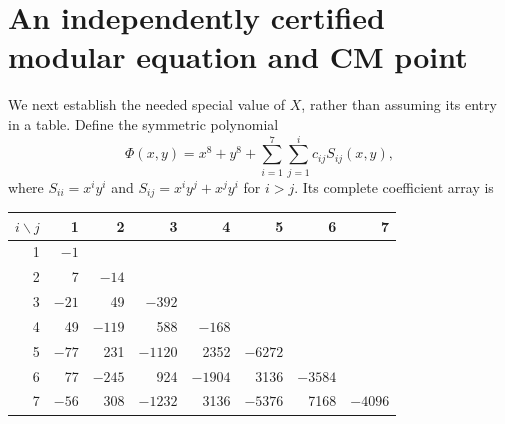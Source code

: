 \documentclass[11pt,a4paper]{article}
\theoremstyle{remark}
\begin{document}
\section{An independently certified modular equation and CM point}
We next establish the needed special value of $X$, rather than assuming
its entry in a table. Define the symmetric polynomial
\begin{equation}\label{eq:Phi}
 \Phi(x,y)=x^8+y^8+\sum_{i=1}^7\sum_{j=1}^i c_{ij}S_{ij}(x,y),
\end{equation}
where $S_{ii}=x^iy^i$ and $S_{ij}=x^iy^j+x^jy^i$ for $i>j$.
Its complete coefficient array is
\begin{center}
\small
\setlength{\tabcolsep}{5pt}
\begin{tabular}{r|rrrrrrr}
$i\backslash j$&1&2&3&4&5&6&7\\\hline
1&$-1$&&&&&&\\
2&7&$-14$&&&&&\\
3&$-21$&49&$-392$&&&&\\
4&49&$-119$&588&$-168$&&&\\
5&$-77$&231&$-1120$&2352&$-6272$&&\\
6&77&$-245$&924&$-1904$&3136&$-3584$&\\
7&$-56$&308&$-1232$&3136&$-5376$&7168&$-4096$
\end{tabular}
\end{center}
\end{document}
